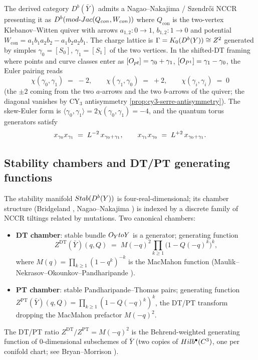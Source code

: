 The derived category $D^b(\bar{Y})$ admits a Nagao--Nakajima / Szendr\H{o}i
NCCR \cite{NagaoNakajima2011, Szendroi2008} presenting it as
$D^b(mod\text{-}Jac(Q_{con}, W_{con}))$ where $Q_{\mathrm{con}}$ is the two-vertex
Klebanov--Witten quiver with arrows $a_{1,2}\colon 0 \to 1$,
$b_{1,2}\colon 1 \to 0$ and potential
$W_{\mathrm{con}} = a_1 b_1 a_2 b_2 - a_1 b_2 a_2 b_1$. The charge lattice is
$\Gamma = K_0(D^b(Y)) \cong Z^2$ generated by simples
$\gamma_0 = [S_0]$, $\gamma_1 = [S_1]$ of the two vertices. In the
shifted-DT framing where points and curve classes enter as
$[O_{pt}] = \gamma_0 + \gamma_1$, $[O_{P^1}] = \gamma_1 - \gamma_0$,
the Euler pairing reads
\[
  \chi(\gamma_0, \gamma_1) \;=\; -2, \qquad \chi(\gamma_1, \gamma_0) \;=\; +2,
  \qquad \chi(\gamma_i, \gamma_i) \;=\; 0
\]
(the $\pm 2$ coming from the two $a$-arrows and the two $b$-arrows of
the quiver; the diagonal vanishes by CY$_3$ antisymmetry
\cref{prop:cy3-serre-antisymmetry}). The skew-Euler form is
$\langle \gamma_0, \gamma_1\rangle = 2\chi(\gamma_0, \gamma_1) = -4$, and the
quantum torus generators satisfy
\[
  x_{\gamma_0} x_{\gamma_1} \;=\; L^{-2}\, x_{\gamma_0 + \gamma_1},
  \qquad
  x_{\gamma_1} x_{\gamma_0} \;=\; L^{+2}\, x_{\gamma_0 + \gamma_1}.
\]

\subsection{Stability chambers and DT/PT generating functions}

The stability manifold $Stab(D^b(Y))$ is four-real-dimensional;
its chamber structure (Bridgeland \cite{Bridgeland2011},
Nagao--Nakajima \cite{NagaoNakajima2011}) is indexed by a discrete
family of NCCR tiltings related by mutations. Two canonical chambers:
\begin{itemize}[leftmargin=2em]
  \item \textbf{DT chamber}: stable bundle $O_{Y} to Y$
        is a generator; generating function
        \[
          Z^{\mathrm{DT}}(\bar{Y})(q, Q) \;=\; M(-q)^{2} \prod_{k \geq 1}\big(1 - Q(-q)^k\big)^{k},
        \]
        where $M(q) = \prod_{k \geq 1}(1 - q^k)^{-k}$ is the MacMahon
        function (Maulik--Nekrasov--Okounkov--Pandharipande
        \cite{MNOP2006}).
  \item \textbf{PT chamber}: stable Pandharipande--Thomas pairs;
        generating function
        $Z^{\mathrm{PT}}(\bar{Y})(q, Q) = \prod_{k \geq 1}(1 - Q(-q)^k)^{k}$, the
        DT/PT transform dropping the MacMahon prefactor $M(-q)^2$.
\end{itemize}
The DT/PT ratio $Z^{\mathrm{DT}}/Z^{\mathrm{PT}} = M(-q)^2$ is the Behrend-weighted
generating function of $0$-dimensional subschemes of $\bar{Y}$
(two copies of $Hilb^\bullet(C^3)$, one per conifold chart; see
Bryan--Morrison \cite{BryanMorrison2012}).

